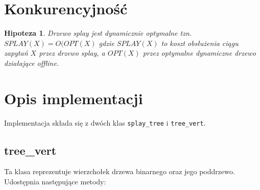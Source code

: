 \documentclass[declaration,shortabstract]{iithesis}
\newcounter{thm}[section]
\theoremstyle{thm}
\theoremstyle{remark}
\theoremstyle{plain}
\theoremstyle{plain}
\newtheorem{hypothesis}[thm]{Hipoteza}
\theoremstyle{plain}
\begin{document}
\section{Konkurencyjność} 
\begin{hypothesis} 
Drzewo splay jest dynamicznie optymalne tzn. \(SPLAY(X) = O(OPT(X)\) gdzie \(SPLAY(X)\) to koszt obsłużenia ciągu zapytań \(X\) przez drzewo splay, a \(OPT(X)\) przez optymalne dynamiczne drzewo działające offline. 
\end{hypothesis}  

\section{Opis implementacji}  

Implementacja składa się z dwóch klas \texttt{splay\_tree} i \texttt{tree\_vert}. 

\subsection{tree\_vert}

Ta klasa reprezentuje wierzchołek drzewa binarnego oraz jego poddrzewo. Udostępnia następujące metody: 
\end{document}
